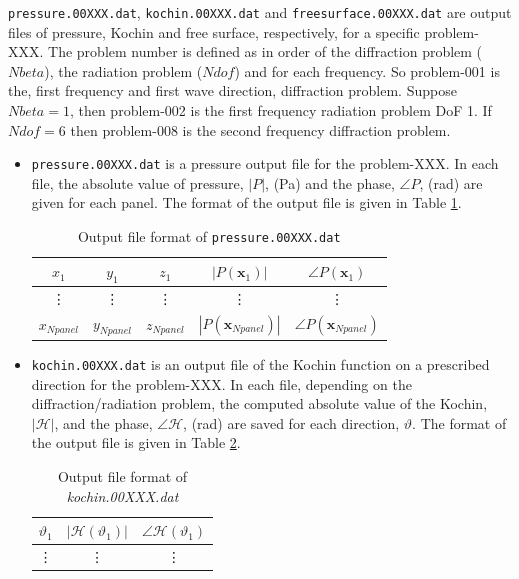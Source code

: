 \documentclass[12pt,a4paper,titlepage]{article}
\newcommand{\bs}{\boldsymbol}
\begin{document}
\noindent
\texttt{pressure.00XXX.dat}, \texttt{kochin.00XXX.dat} and \texttt{freesurface.00XXX.dat} are output files of pressure, Kochin and free surface, respectively, for a specific problem-XXX. The problem number is defined as in order of the diffraction problem ($Nbeta$), the radiation problem ($Ndof$) and for each frequency. So problem-001 is the, first frequency and first wave direction, diffraction problem. Suppose $Nbeta=1$, then problem-002 is the first frequency radiation problem DoF 1. If $Ndof=6$ then problem-008 is the second frequency diffraction problem.
\begin{itemize}
    \item \texttt{pressure.00XXX.dat} is a pressure output file for the problem-XXX.  In each file, the absolute value of pressure, $|P|$, (Pa) and the phase, $\angle P$, (rad) are given for each panel. The format of the output file is given in Table \ref{tab:pressure}.
\begin{table}[ht]
\begin{center}
\caption{Output file format of \texttt{pressure.00XXX.dat}}\label{tab:pressure}
\begin{tabular}{ccccc}
\hline
$x_1$ &$y_1$ &$z_1$ &$|P(\bs x_1)|$ & $\angle P(\bs x_1)$\\
\hline
\vdots &\vdots &\vdots &\vdots &\vdots
\\
\hline
$x_{Npanel}$ &$y_{Npanel}$ &$z_{Npanel}$ &$|P(\bs x_{Npanel})|$ & $\angle P(\bs x_{Npanel})$\\
\hline
\end{tabular}
\end{center}
\end{table}  
    \item \texttt{kochin.00XXX.dat} is an output file of the Kochin function on a prescribed direction for the problem-XXX. In each file, depending on the diffraction/radiation problem, the computed absolute value of the Kochin, $|\mathcal{H}|$, and the phase, $\angle \mathcal{H}$, (rad) are saved for each direction, $\vartheta$. The format of the output file is given in Table \ref{tab:kochin}.
\begin{table}[ht]
\begin{center}
\caption{Output file format of \textit{kochin.00XXX.dat}}\label{tab:kochin}
\begin{tabular}{ccc}
\hline
$\vartheta_1$ &$|\mathcal{H}(\vartheta_1)|$ & $\angle \mathcal{H}(\vartheta_1)$\\
\hline
\vdots &\vdots &\vdots
\\
\hline

\end{tabular}
\end{center}
\end{table}
\end{itemize}
\end{document}
